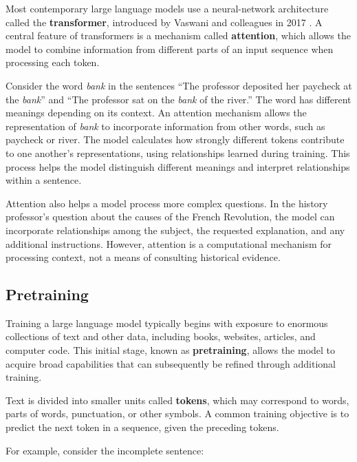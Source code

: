 \documentclass[11pt]{article}
\begin{document}
%


Most contemporary large language models use a neural-network architecture called the \textbf{transformer}, introduced by Vaswani and colleagues in 2017 \citep{Vaswani2017}.
A central feature of transformers is a mechanism called \textbf{attention}, which allows the model to combine information from different parts of an input sequence when processing each token.

Consider the word \emph{bank} in the sentences ``The professor deposited her paycheck at the \emph{bank}'' and ``The professor sat on the \emph{bank} of the river.'' The word has different meanings depending on its context. An attention mechanism allows the representation of \emph{bank} to incorporate information from other words, such as paycheck or river. The model calculates how strongly different tokens contribute to one another's representations, using relationships learned during training. This process helps the model distinguish different meanings and interpret relationships within a sentence.

Attention also helps a model process more complex questions. In the history professor's question about the causes of the French Revolution, the model can incorporate relationships among the subject, the requested explanation, and any additional instructions. However, attention is a computational mechanism for processing context, not a means of consulting historical evidence.




\subsection{Pretraining}\label{sec:pretraining}

Training a large language model typically begins with exposure to enormous collections of text and other data, including books, websites, articles, and computer code. This initial stage, known as \textbf{pretraining}, allows the model to acquire broad capabilities that can subsequently be refined through additional training.

Text is divided into smaller units called \textbf{tokens},
which may correspond to words, parts of words, punctuation,
or other symbols. A common training objective is to predict
the next token in a sequence, given the preceding tokens.

For example, consider the incomplete sentence:
\end{document}
